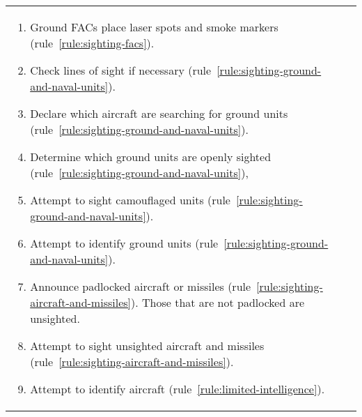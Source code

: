 \begin{twocolumntable}
\begin{tabularx}{1.0\linewidth}{L@{\hspace{\columnsep}}L}
{\begin{enumerate}
\begin{enumerate}[nosep]
    \item Ground FACs place laser spots and smoke markers (rule~\ref{rule:sighting-facs}).
    \item Check lines of sight if necessary (rule~\ref{rule:sighting-ground-and-naval-units}).
    \item Declare which aircraft are searching for ground units (rule~\ref{rule:sighting-ground-and-naval-units}).
    \item Determine which ground units are openly sighted (rule~\ref{rule:sighting-ground-and-naval-units}),
    \item Attempt to sight camouflaged units (rule~\ref{rule:sighting-ground-and-naval-units}).
    \item Attempt to identify ground units (rule~\ref{rule:sighting-ground-and-naval-units}).
    \item Announce padlocked aircraft or missiles (rule~\ref{rule:sighting-aircraft-and-missiles}). Those that are not padlocked are unsighted.
    \item Attempt to sight unsighted aircraft and missiles (rule~\ref{rule:sighting-aircraft-and-missiles}).
    \item Attempt to identify aircraft (rule~\ref{rule:limited-intelligence}).
\end{enumerate}



\end{enumerate}}
\end{tabularx}
\end{twocolumntable}
